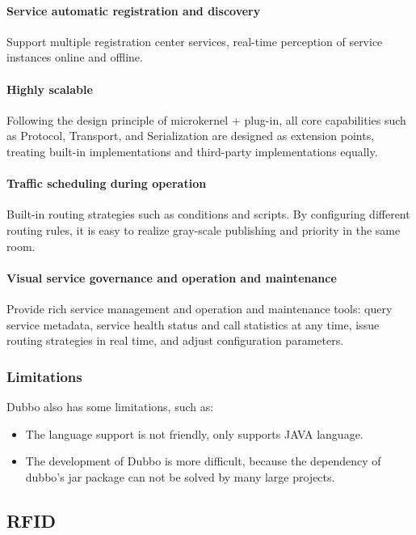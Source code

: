 \documentclass[conference]{IEEEtran}
\begin{document}
\paragraph{Service automatic registration and discovery}
Support multiple registration center services, real-time perception of service instances online and offline.

\paragraph{Highly scalable}
Following the design principle of microkernel + plug-in, all core capabilities such as Protocol, Transport, and Serialization are designed as extension points, treating built-in implementations and third-party implementations equally.

\paragraph{Traffic scheduling during operation}
Built-in routing strategies such as conditions and scripts. By configuring different routing rules, it is easy to realize gray-scale publishing and priority in the same room.

\paragraph{Visual service governance and operation and maintenance}
Provide rich service management and operation and maintenance tools: query service metadata, service health status and call statistics at any time, issue routing strategies in real time, and adjust configuration parameters.


\subsubsection{Limitations}
Dubbo also has some limitations, such as:

\begin{itemize}
\item The language support is not friendly, only supports JAVA language.

\item The development of Dubbo is more difficult, because the dependency of dubbo's jar package can not be solved by many large projects.
\end{itemize}


\subsection{RFID}
\end{document}
